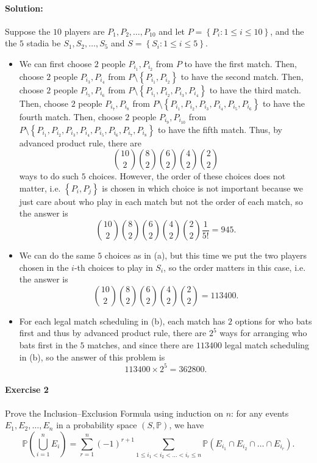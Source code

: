 \documentclass[a4paper,12pt]{article}
\newcommand{\mb}[1]{\mathbb{#1}}
\begin{document}
\paragraph{Solution:} 
Suppose the \(10\) players are \(P_1, P_2, \dots , P_{10}\) and let \(P = \left\{ P_i : 1 \le i \le 10  \right\} \), and the the \(5\) stadia be \(S_1, S_2, \dots , S_5\) and \(S = \left\{ S_i : 1 \le i \le 5 \right\} \).    
\begin{itemize}
	\item [(a)]  We can first choose \(2\) people \(P_{i_1}, P_{i_2}\) from \(P\) to have the first match. Then, choose \(2\) people \(P_{i_3}, P_{i_4}\) from \(P \setminus \left\{ P_{i_1}, P_{i_2} \right\} \) to have the second match. Then, choose \(2\) people \(P_{i_5}, P_{i_6}\) from \(P \setminus \left\{ P_{i_1}, P_{i_2}, P_{i_3}, P_{i_4} \right\} \) to have the third match. Then, choose \(2\) people \(P_{i_7}, P_{i_8}\) from \(P \setminus \left\{ P_{i_1}, P_{i_2}, P_{i_3}, P_{i_4}, P_{i_5}, P_{i_6} \right\} \) to have the fourth match. Then, choose \(2\) people \(P_{i_9}, P_{i_{10}}\) from \(P \setminus \left\{ P_{i_1}, P_{i_2}, P_{i_3}, P_{i_4}, P_{i_5}, P_{i_6}, P_{i_7}, P_{i_8} \right\} \) to have the fifth match. Thus, by advanced product rule, there are 
	\[
		\binom{10}{2} \binom{8}{2} \binom{6}{2} \binom{4}{2} \binom{2}{2}
	\]
	ways to do such \(5\) choices. However, the order of these choices does not matter, i.e. \(\left\{ P_i, P_j \right\} \) is chosen in which choice is not important because we just care about who play in each match but not the order of each match, so the answer is 
	\[
		\binom{10}{2} \binom{8}{2} \binom{6}{2} \binom{4}{2} \binom{2}{2} \frac{1}{5!} = 945.
	\] 
	\item [(b)] We can do the same \(5\) choices as in (a), but this time we put the two players chosen in the \(i\)-th choices to play in \(S_i\), so the order matters in this case, i.e. the answer is 
	\[
		\binom{10}{2} \binom{8}{2} \binom{6}{2} \binom{4}{2} \binom{2}{2} = 113400.
	\]
	\item [(c)] For each legal match scheduling in (b), each match has \(2\) options for who bats first and thus by advanced product rule, there are \(2^5\) ways for arranging who bats first in the \(5\) matches, and since there are \(113400\) legal match scheduling in (b), so the answer of this problem is 
	\[
		113400 \times 2^5 = 362800.
	\]
\end{itemize}

\newpage

\paragraph{Exercise 2}  Prove the Inclusion--Exclusion Formula using induction on $n$: for any events $E_1, E_2, \hdots, E_n$ in a probability space $(S, \mb P)$, we have
\[ \mb{P} \left( \bigcup_{i=1}^n E_i \right) = \sum_{r=1}^n (-1)^{r+1} \sum_{1 \le i_1 < i_2 < \hdots < i_r \le n} \mb{P} \left( E_{i_1} \cap E_{i_2} \cap \hdots \cap E_{i_r} \right).\]
\end{document}
